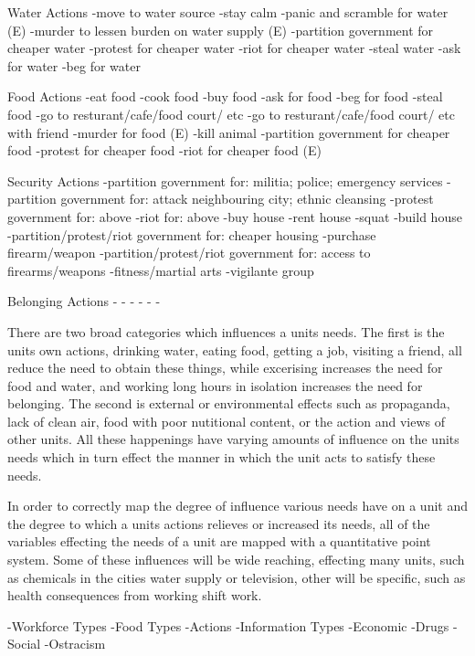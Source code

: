 Water Actions
-move to water source
-stay calm
-panic and scramble for water (E)
-murder to lessen burden on water supply (E)
-partition government for cheaper water
-protest for cheaper water
-riot for cheaper water
-steal water
-ask for water
-beg for water


Food Actions
-eat food
-cook food
-buy food
-ask for food
-beg for food
-steal food 
-go to resturant/cafe/food court/ etc
-go to resturant/cafe/food court/ etc with friend
-murder for food (E)
-kill animal
-partition government for cheaper food
-protest for cheaper food
-riot for cheaper food (E)


Security Actions
-partition government for: militia; police; emergency services
-partition government for: attack neighbouring city; ethnic cleansing
-protest government for: above
-riot for: above
-buy house
-rent house
-squat
-build house
-partition/protest/riot government for: cheaper housing
-purchase firearm/weapon
-partition/protest/riot government for: access to firearms/weapons
-fitness/martial arts
-vigilante group



Belonging Actions
-
-
-
-
-
-


There are two broad categories which influences a units needs. The first is the units own actions, drinking water, eating food, getting a job, visiting a friend, all reduce the need to obtain these things, while excerising increases the need for food and water, and working long hours in isolation increases the need for belonging. The second is external or environmental effects such as propaganda, lack of clean air, food with poor nutitional content, or the action and views of other units. All these happenings have varying amounts of influence on the units needs which in turn effect the manner in which the unit acts to satisfy these needs.

In order to correctly map the degree of influence various needs have on a unit and the degree to which a units actions relieves or increased its needs, all of the variables effecting the needs of a unit are mapped with a quantitative point system. Some of these influences will be wide reaching, effecting many units, such as chemicals in the cities water supply or television, other will be specific, such as health consequences from working shift work. 


-Workforce Types
-Food Types
-Actions
-Information Types
-Economic 
-Drugs
-Social
-Ostracism





